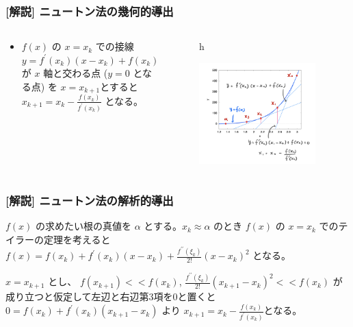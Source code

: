 \documentclass[dvipdfmx,aspectratio=169,20pt]{beamer}
\newcommand{\myfontsetting}[3]{{\fontsize{#1}{#2}\selectfont #3}}
\begin{document}
\begin{frame}
\frametitle{\large [解説] ニュートン法の幾何的導出}
\begin{columns}[t]
\begin{column}{0.5\textwidth} 
\vspace{-5mm}
\begin{itemize}
    \setlength{\itemsep}{0.5cm}
    \item 
    \myfontsetting{15pt}{17pt}{
    $f(x)$ の $x=x_k$ での接線 $y=f^\prime(x_k)(x-x_k)+f(x_k)$ が $x$ 軸と交わる点 ($y=0$ となる点) を $x=x_{k+1}$とすると
    $x_{k+1}=x_k - \frac{f(x_k)}{f^\prime(x_k)}$ となる。
    }
\end{itemize}
\end{column}
\begin{column}{0.5\textwidth} 
\begin{figure}{h}
	\begin{center}
\vspace{-25mm}
    	\includegraphics[width=0.94\textwidth]{fig04-1_newtons_method_proof.jpeg}
	\end{center}
\end{figure}
\end{column}
\end{columns}
\end{frame}
\begin{frame}
\frametitle{\large [解説] ニュートン法の解析的導出}
\begin{itemize}
    \setlength{\itemsep}{0.3cm}
    \myfontsetting{15pt}{17pt}{
    \item $f(x)$ の求めたい根の真値を $\alpha$ とする。$x_k \approx \alpha$ のとき $f(x)$ の $x=x_k$ でのテイラーの定理を考えると $f(x) = f(x_k) +f^\prime(x_k)(x-x_k)+\frac{f^{\prime\prime}(\xi_k)}{2!}(x-x_k)^2$ となる。
    \item $x=x_{k+1}$ とし、 $f(x_{k+1})<<f(x_k)$, $\frac{f^{\prime\prime}(\xi_k)}{2!}(x_{k+1}-x_k)^2<<f(x_k)$ が成り立つと仮定して左辺と右辺第3項を0と置くと $0=f(x_k)+f^\prime(x_k)(x_{k+1}-x_k)$ より   $x_{k+1}=x_k - \frac{f(x_k)}{f^\prime(x_k)}$となる。
    }
\end{itemize}
\end{frame}
\end{document}
